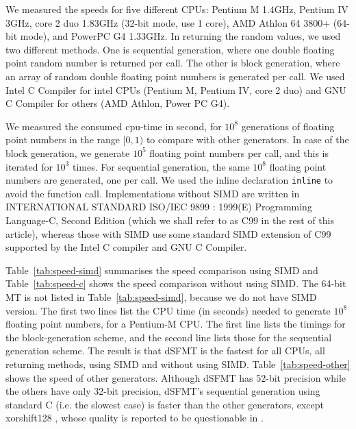 \documentclass{svmult}
\begin{document}
We measured the speeds for five different CPUs: Pentium M 1.4GHz,
Pentium IV 3GHz, core 2 duo 1.83GHz (32-bit mode, use 1 core), AMD
Athlon 64 3800+ (64-bit mode), and PowerPC G4 1.33GHz.  In returning
the random values, we used two different methods.  One is sequential
generation, where one double floating point random number is returned
per call.  The other is block generation, where an array of random
double floating point numbers is generated per call.  We used
Intel C Compiler for intel CPUs (Pentium M, Pentium IV, core 2 duo)
and GNU C Compiler for others (AMD Athlon, Power PC G4).

We measured the consumed cpu-time in second, for $10^8$ generations of
floating point numbers in the range $[0, 1)$ to compare with other
generators. In case of the block generation, we
generate $10^5$ floating point numbers per call, and this is
iterated for $10^3$ times.  For sequential generation, the same $10^8$
floating point numbers are generated, one per call.  We used
the inline declaration {\tt inline} to avoid the function call.
Implementations without SIMD are written in INTERNATIONAL STANDARD
ISO/IEC 9899 : 1999(E) Programming Language-C, Second Edition (which
we shall refer to as C99 in the rest of this article), whereas those
with SIMD use some standard SIMD extension of C99 supported by the
Intel C compiler and GNU C Compiler.

Table~\ref{tab:speed-simd} summarises the speed comparison using SIMD
and Table~\ref{tab:speed-c} shows the speed comparison without using
SIMD.  The 64-bit MT is not listed in Table~\ref{tab:speed-simd}, because
we do not have SIMD version.  The first two lines list the CPU time (in
seconds) needed to generate $10^8$ floating point numbers, for a
Pentium-M CPU.  The first line lists the timings for the
block-generation scheme, and the second line lists those for the
sequential generation scheme. 
The result is that dSFMT is the fastest for all CPUs, all
returning methods, using SIMD and without using SIMD.
Table~\ref{tab:speed-other} shows the speed of other
generators. Although
dSFMT has 52-bit precision while the others have only 32-bit
precision, dSFMT's sequential generation using standard
C (i.e. the slowest case) is faster than the other generators, except xorshift128
\cite{XORSHIFT-MAR}, whose quality is reported to be questionable 
in \cite{XORSHIFT-LEcuyer}.
\end{document}
